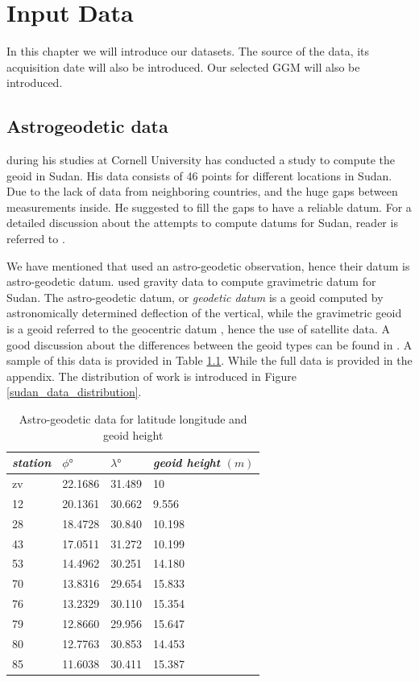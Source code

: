 \chapter{Input Data}
\label{Chapter3}


In this chapter we will introduce our datasets. The source of the data, its acquisition date will also be introduced. Our selected GGM will also be introduced.

\section{Astrogeodetic data}

\cite{osman} during his studies at Cornell University has conducted a study to compute the geoid in Sudan. His data consists of 46 points for different locations in Sudan. Due to the lack of data from neighboring countries, and the huge gaps between measurements inside. He suggested to fill the gaps to have a reliable datum. For a detailed discussion about the attempts to compute datums for Sudan, reader is referred to \citep{ahmed_similar}. 

We have mentioned that \citet{osman} used an astro-geodetic observation, hence their datum is astro-geodetic datum. \citet{ahmed_msc} used gravity data to compute gravimetric datum for Sudan. The astro-geodetic datum, or \emph{geodetic datum} is a geoid computed by astronomically determined deflection of the vertical, while the gravimetric geoid is a geoid referred to the geocentric datum \cite{vanicek}, hence the use of satellite data. A good discussion about the differences between the geoid types can be found in \cite{vanicek}. A sample of this data is provided in Table \ref{table:sudan_astro_data}. While the full data is provided in the appendix. The distribution of \citep{osman} work is introduced in Figure \ref{sudan_data_distribution}. 

\begin{table}[]
	\centering
	\caption{Astro-geodetic data for latitude longitude and geoid height}
	\label{table:sudan_astro_data}
		\begin{tabular}{@{}llll@{}}
			\toprule
			\emph{station} & $\phi \si{\degree}$  & $\lambda \si{\degree}$ & \emph{geoid height} $(m)$\\ \midrule
			
			zv & 22.1686 & 31.489 & 10\\
			12 & 20.1361 & 30.662 & 9.556\\
			28 & 18.4728 & 30.840 & 10.198\\
			43 & 17.0511 & 31.272 & 10.199\\
			53 & 14.4962 & 30.251 & 14.180\\
			70 & 13.8316 & 29.654 & 15.833\\
			76 & 13.2329 & 30.110 & 15.354\\
			79 &12.8660 & 29.956 & 15.647\\
			80 &12.7763 & 30.853 & 14.453\\
			85 &11.6038 & 30.411 & 15.387\\ \bottomrule
			
		\end{tabular}
\end{table}


